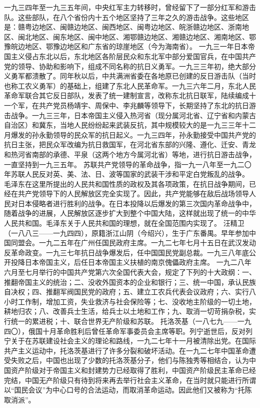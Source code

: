 \begin{maonote}
一九三四年至一九三五年间，中央红军主力转移时，曾经留下了一部分红军和游击队。这些部队，在八个省份内十五个地区坚持了三年之久的游击战争。这些地区是：赣粤边地区、闽赣边地区、闽西地区、闽粤边地区、皖浙赣边地区、浙南地区、闽北地区、闽东地区、闽中地区、湘鄂赣边地区、湘赣边地区、湘南地区、鄂豫皖边地区、鄂豫边地区和广东省的琼崖地区（今为海南省）。
一九三一年日本帝国主义侵占东北以后，东北地区各阶层民众和东北军中部分爱国官兵，在中国共产党的领导、协助和影响下，组成不同名称的抗日义勇军。一九三三年初，绝大部分义勇军都溃散了。同年秋以后，中共满洲省委在各地原已创建的反日游击队（当时也称工农义勇军）的基础上，组建了东北人民革命军。一九三六年二月，东北人民革命军联合其它反日部队，发表了统一建制宣言，改称东北抗日联军，陆续编成十一个军，在共产党员杨靖宇、周保中、李兆麟等领导下，长期坚持了东北的抗日游击战争。一九三三年，日本帝国主义侵入热河省（现分属河北省、辽宁省和内蒙古自治区）和冀东，当地人民纷纷起来武装反抗，其中规模较大的是一九三三年十二月爆发的孙永勤领导的民众军的抗日起义。一九三四年，孙永勤接受中国共产党的抗日主张，把民众军改编为抗日救国军，在河北省东部的兴隆、遵化、迁安、青龙和热河省南部的承德、平泉（这两个地方今属河北省）等地，进行抗日游击战争，一直坚持到一九三五年。
苏联共产党领导的革命战争，指一九一八年至一九二〇年苏联人民反对英、美、法、日、波等国家的武装干涉和平定白党叛乱的战争。
毛泽东在这里所提出的人民共和国性质的政权及其各项政策，在抗日战争期间，已经在共产党领导下的人民解放区完全实现了。因此，共产党能够在敌后战场领导人民对日本侵略者进行胜利的战争。在日本投降以后爆发的第三次国内革命战争中，随着战争的进展，人民解放区逐步扩大到整个中国大陆，这样就出现了统一的中华人民共和国。毛泽东关于人民共和国的理想，就在全国范围内实现了。
汪精卫（一八八三——一九四四），原籍浙江山阴（今绍兴），生于广东番禺。早年参加中国同盟会。一九二五年在广州任国民政府主席。一九二七年七月十五日在武汉发动反革命政变。一九三七年抗日战争爆发后，任中国国民党副总裁。一九三八年底公开投降日本帝国主义，后任日本帝国主义扶植的南京傀儡政府主席。
一九二八年六月至七月举行的中国共产党第六次全国代表大会，规定了下列的十大政纲：一、推翻帝国主义的统治；二、没收外国资本的企业和银行；三、统一中国，承认民族自决权；四、推翻军阀国民党的政府；五、建立工农兵代表会议政府；六、实行八小时工作制，增加工资，失业救济与社会保险等；七、没收地主阶级的一切土地，耕地归农；八、改善兵士生活，给兵士以土地和工作；九、取消一切苛捐杂税，实行统一的累进税；十、联合世界无产阶级和苏联。
托洛茨基（一八七九——一九四〇），俄国十月革命胜利后曾任革命军事委员会主席等职。列宁逝世后，反对列宁关于在苏联建设社会主义的理论和路线，一九二七年十一月被清除出党。在国际共产主义运动中，托洛茨基进行了许多分裂和破坏活动。在一九二七年中国革命遭受失败之后，中国也出现了少数的托洛茨基分子，他们与陈独秀等相结合，认为中国资产阶级对于帝国主义和封建势力已经取得了胜利，中国资产阶级民主革命已经完结，中国无产阶级只有待到将来再去举行社会主义革命，在当时就只能进行所谓以“国民会议”为中心口号的合法运动，而取消革命运动。因此他们又被称为“托陈取消派”。

\end{maonote}
